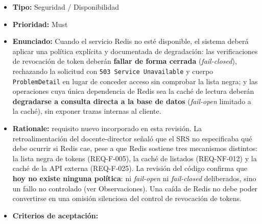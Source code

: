 \documentclass[
  spanish,
]{article}
\providecommand{\tightlist}{%
  \setlength{\itemsep}{0pt}\setlength{\parskip}{0pt}}
\begin{document}
\begin{itemize}
\tightlist
\item
  \textbf{Tipo:} Seguridad / Disponibilidad
\item
  \textbf{Prioridad:} Must
\item
  \textbf{Enunciado:} Cuando el servicio Redis no esté disponible, el
  sistema deberá aplicar una política explícita y documentada de
  degradación: las verificaciones de revocación de token deberán
  \textbf{fallar de forma cerrada} (\emph{fail-closed}), rechazando la
  solicitud con \texttt{503\ Service\ Unavai\allowbreak{}lable} y cuerpo
  \texttt{Problem\allowbreak{}Detail} en lugar de conceder acceso sin comprobar la
  lista negra; y las operaciones cuya única dependencia de Redis sea la
  caché de lectura deberán \textbf{degradarse a consulta directa a la
  base de datos} (\emph{fail-open} limitado a la caché), sin exponer
  trazas internas al cliente.
\item
  \textbf{Rationale:} requisito nuevo incorporado en esta revisión. La
  retroalimentación del docente-director señaló que el SRS no
  especificaba qué debe ocurrir si Redis cae, pese a que Redis sostiene
  tres mecanismos distintos: la lista negra de tokens (REQ-F-005), la
  caché de listados (REQ-NF-012) y la caché de la API externa
  (REQ-F-025). La revisión del código confirma que \textbf{hoy no existe
  ninguna política}: ni \emph{fail-open} ni \emph{fail-closed}
  deliberados, sino un fallo no controlado (ver Observaciones). Una
  caída de Redis no debe poder convertirse en una omisión silenciosa del
  control de revocación de tokens.
\item
  \textbf{Criterios de aceptación:}


\end{itemize}
\end{document}

